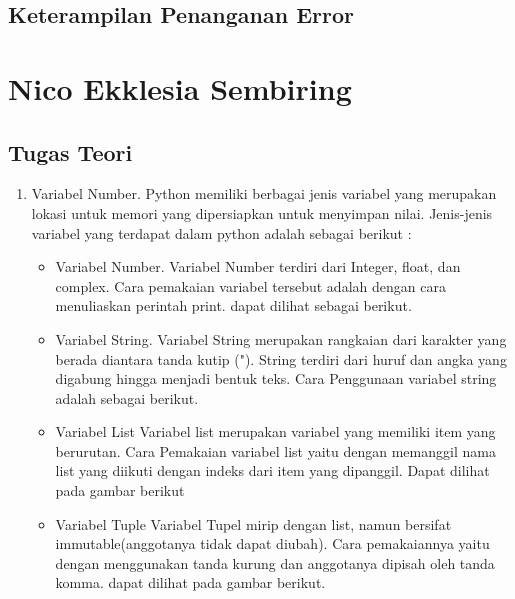 \subsection{Keterampilan Penanganan Error}


\section{Nico Ekklesia Sembiring}
\subsection{Tugas Teori}
\begin{enumerate}
\item Variabel Number.
Python memiliki berbagai jenis variabel yang merupakan lokasi untuk memori yang dipersiapkan untuk menyimpan nilai. Jenis-jenis variabel yang terdapat dalam python adalah sebagai berikut :
\begin{itemize}
    \item Variabel Number.
    Variabel Number terdiri dari Integer, float, dan complex. 
    Cara pemakaian variabel tersebut adalah dengan cara menuliaskan perintah print. dapat dilihat sebagai berikut.
    
   
    \item Variabel String.
    Variabel String merupakan rangkaian dari karakter yang berada diantara tanda kutip ("). String terdiri dari huruf dan angka yang digabung hingga menjadi bentuk teks.
    Cara Penggunaan variabel string adalah sebagai berikut.
    
  
    \item Variabel List
    Variabel list merupakan variabel yang memiliki item yang berurutan. Cara Pemakaian variabel list yaitu dengan memanggil nama list yang diikuti dengan indeks dari item yang dipanggil. Dapat dilihat pada gambar berikut
     

    \item Variabel Tuple
    Variabel Tupel mirip dengan list, namun bersifat immutable(anggotanya tidak dapat diubah). Cara pemakaiannya yaitu dengan menggunakan tanda kurung dan anggotanya dipisah oleh tanda komma. dapat dilihat pada gambar berikut.
    


\end{itemize}
\end{enumerate}
